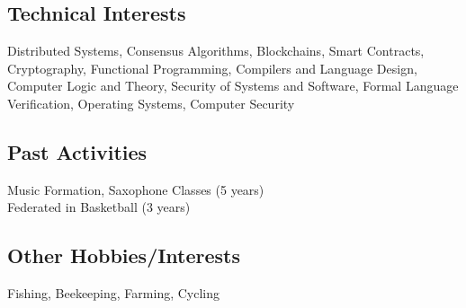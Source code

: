 \documentclass[a4paper,12pt]{article}
\begin{document}


\vspace*{10pt}
\subsection{Technical Interests}
Distributed Systems, Consensus Algorithms, Blockchains, Smart Contracts, Cryptography, Functional Programming, Compilers and Language Design, Computer Logic and Theory, Security of Systems and Software, Formal Language Verification, Operating Systems, Computer Security

\vspace*{6pt}
\subsection{Past Activities}
Music Formation, Saxophone Classes (5 years)\\
Federated in Basketball (3 years)

\vspace*{6pt}
\subsection{Other Hobbies/Interests}
Fishing, Beekeeping, Farming, Cycling
\end{document}

